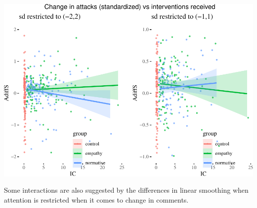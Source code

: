\documentclass[
  10pt,
  dvipsnames,enabledeprecatedfontcommands]{scrartcl}
\begin{document}
\begin{center}\includegraphics[width=1\linewidth]{bayesianReport3_files/figure-latex/ic-1} \end{center}
\normalsize

Some interactions are also suggested by the differences in linear
smoothing when attention is restricted when it comes to change in
comments.

\vspace{1mm}
\footnotesize
\end{document}
